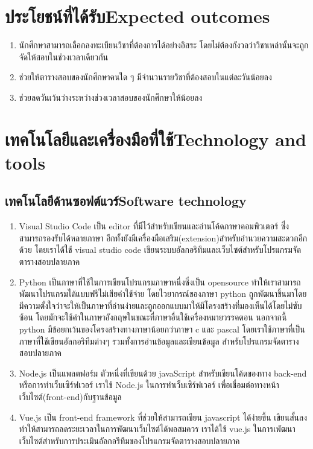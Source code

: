 \section{\ifcpe ประโยชน์ที่ได้รับ\else Expected outcomes\fi}
\begin{enumerate}
    \item นักศึกษาสามารถเลือกลงทะเบียนวิชาที่ต้องการได้อย่างอิสระ โดยไม่ต้องกังวลว่าวิชาเหล่านั้นจะถูกจัดให้สอบในช่วงเวลาเดียวกัน
    \item ช่วยให้ตารางสอบของนักศึกษาคนใด ๆ มีจำนวนรายวิชาที่ต้องสอบในแต่ละวันน้อยลง
    \item ช่วยลดวันเว้นว่างระหว่างช่วงเวลาสอบของนักศึกษาให้น้อยลง 
\end{enumerate}

\section{\ifcpe เทคโนโลยีและเครื่องมือที่ใช้\else Technology and tools\fi}


\subsection{\ifcpe เทคโนโลยีด้านซอฟต์แวร์\else Software technology\fi}
\begin{enumerate}
    \item Visual Studio Code เป็น editor ที่มีไว้สำหรับเขียนและอ่านโค้ดภาษาคอมพิวเตอร์ ซึ่่งสามารถรองรับได้หลายภาษา อีกทั้งยังมีเครื่องมือเสริม(extension)สำหรับอำนวยความสะดวกอีกด้วย โดยเราได้ใช้ visual studio code เขียนระบบอัลกอริทึมและเว็บไซต์สำหรับโปรแกรมจัดตารางสอบปลายภาค
    \item Python เป็นภาษาที่ใช้ในการเขียนโปรแกรมภาษาหนึ่งซึ่งเป็น opensource ทำให้เราสามารถพัฒนาโปรแกรมได้แบบฟรีไม่เสียค่าใช้จ่าย โดยไวยากรณ์ของภาษา python ถูกพัฒนาขึ้นมาโดยมีความตั้งใจว่าจะให้เป็นภาษาที่อ่านง่ายและถูกออกแบบมาให้มีโครงสร้างที่มองเห็นได้โดยไม่ซับซ้อน โดยมักจะใช้คำในภาษาอังกฤษในขณะที่ภาษาอื่นใช้เครื่องหมายวรรคตอน นอกจากนี้ python มีข้อยกเว้นของโครงสร้างทางภาษาน้อยกว่าภาษา c และ pascal โดยเราใช้ภาษาที่เป็นภาษาที่ใช้เขียนอัลกอริทึมต่างๆ รวมทั้งการอ่านข้อมูลและเขียนข้อมูล สำหรับโปรแกรมจัดตารางสอบปลายภาค
    \item Node.js เป็นแพลตฟอร์ม ตัวหนึ่งที่เขียนด้วย javaScript สำหรับเขียนโค้ดของทาง back-end หรือการทำเว็บเซิร์ฟเวอร์ เราใช้ Node.js ในการทำเว็บเซิร์ฟเวอร์ เพื่อเชื่อมต่อทางหน้าเว็บไซต์(front-end)กับฐานข้อมูล 
    \item Vue.js เป็น front-end framework ที่ช่วยให้สามารถเขียน javascript ได้ง่ายขึ้น เขียนสั้นลง ทำให้สามารถลดระยะเวลาในการพัฒนาเว็บไซต์ได้พอสมควร เราได้ใช้ vue.js ในการเพัฒนาเว็บไซต์สำหรับการประเมินอัลกอรึทึมของโปรแกรมจัดตารางสอบปลายภาค
\end{enumerate}

